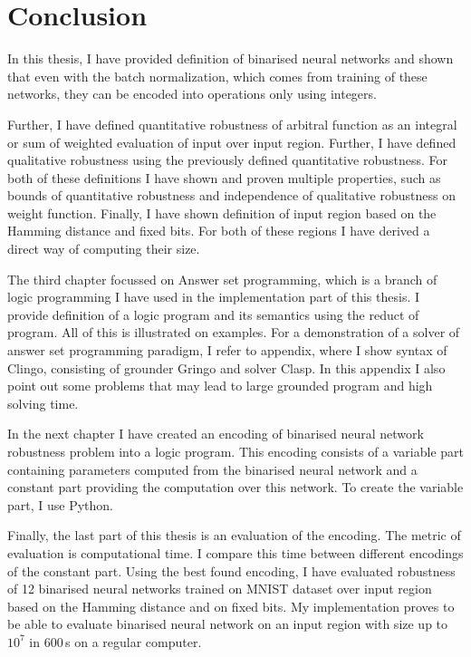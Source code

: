 \chapter*{Conclusion}
In this thesis, I have provided definition of binarised neural networks
and shown that even with the batch normalization, which comes from training of these
networks, they can be encoded into operations only using integers.

Further, I have defined quantitative robustness of arbitral function
as an integral or sum of weighted evaluation of input over input region.
Further, I have defined qualitative robustness using the previously defined
quantitative robustness. For both of these definitions I have shown and proven
multiple properties, such as bounds of quantitative robustness and independence
of qualitative robustness on weight function.
Finally, I have shown definition of input region based on the Hamming distance
and fixed bits. For both of these regions I have derived a direct way
of computing their size.

The third chapter focussed on Answer set programming, which is a branch of logic programming
I have used in the implementation part of this thesis.
I provide definition of a logic program and its semantics using the reduct of program.
All of this is illustrated on examples.
For a demonstration of a solver of answer set programming paradigm,
I refer to appendix, where I show syntax of Clingo,
consisting of grounder Gringo and solver Clasp. In this appendix I also point out
some problems that may lead to large grounded program and high solving time.

In the next chapter I have created an encoding of binarised neural network
robustness problem
into a logic program. This encoding consists of a variable part containing
parameters computed from the binarised neural network and a constant part
providing the computation over this network.
To create the variable part, I use Python.

Finally, the last part of this thesis is an evaluation of the encoding.
The metric of evaluation is computational time. I compare this time between
different encodings of the constant part. Using the best found encoding,
I have evaluated robustness of 12 binarised neural networks trained on MNIST dataset
over input region based on the Hamming distance and on fixed bits.
My implementation proves to be able to evaluate binarised neural network
on an input region with size up to $10^7$ in 600\,s on a regular computer.
